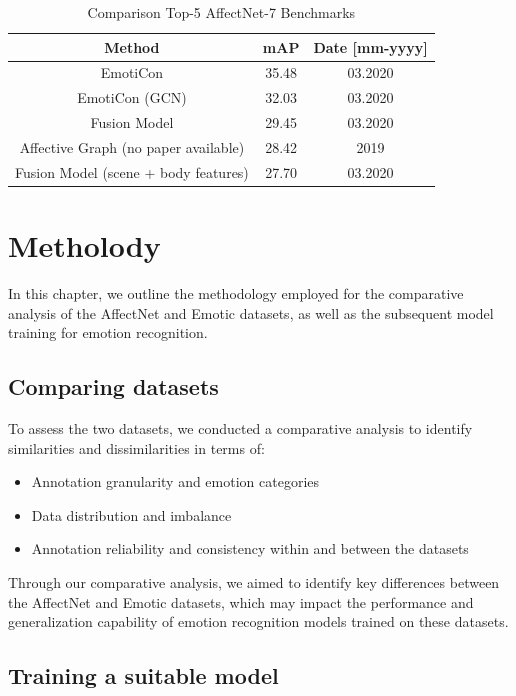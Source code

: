 \documentclass[conference]{IEEEtran}
\begin{document}
\begin{table}[htbp]
\centering
\begin{tabular}{c | c  | c }
\textbf{Method} & \textbf{mAP} & \textbf{Date [mm-yyyy]} \\
\hline
EmotiCon \cite{mittal2020emoticon} &35.48 &  03.2020 \\
EmotiCon (GCN) \cite{mittal2020emoticon} & 32.03 &  03.2020 \\
Fusion Model \cite{Kosti_2019} & 29.45 &  03.2020 \\
Affective Graph (no paper available) & 28.42 &  2019 \\
Fusion Model (scene + body features) \cite{Kosti_2019} & 27.70 & 03.2020 \\
\end{tabular}
\caption{Comparison Top-5 AffectNet-7 Benchmarks}
\label{tab:relatedworkemotic}
\end{table}


\section{Metholody}

In this chapter, we outline the methodology employed for the comparative analysis of the AffectNet and Emotic datasets, as well as the subsequent model training for emotion recognition.

\subsection{Comparing datasets}

To assess the two datasets, we conducted a comparative analysis to identify similarities and dissimilarities in terms of:
\begin{itemize}
\item Annotation granularity and emotion categories
\item Data distribution and imbalance
\item Annotation reliability and consistency within and between the datasets
\end{itemize}

Through our comparative analysis, we aimed to identify key differences between the AffectNet and Emotic datasets, which may impact the performance and generalization capability of emotion recognition models trained on these datasets.

\subsection{Training a suitable model}
\end{document}
